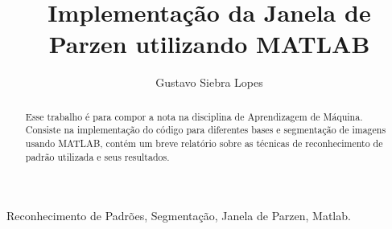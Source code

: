 \documentclass[preprint,12pt]{elsarticle}
\begin{document}
	
	\begin{frontmatter}
		
		

\title{Implementação da Janela de Parzen utilizando MATLAB}


{\author[label1]{Gustavo Siebra Lopes}

\address[label1]{Programa de Pós-Graduação em Ciências da Computação, Instituto Federal do Ceará, Fortaleza, CE, Brazil. Email: gustavosiebra@gmail.com}}

\begin{abstract}
Esse trabalho é para compor a nota na disciplina de Aprendizagem de Máquina. Consiste na implementação do código para diferentes bases e segmentação de imagens usando MATLAB, contém um breve relatório sobre as técnicas de reconhecimento de padrão utilizada e seus resultados.
\end{abstract}

\begin{keyword}
Reconhecimento de Padrões, Segmentação, Janela de Parzen, Matlab.

\end{keyword}

\end{frontmatter}

\end{document}
